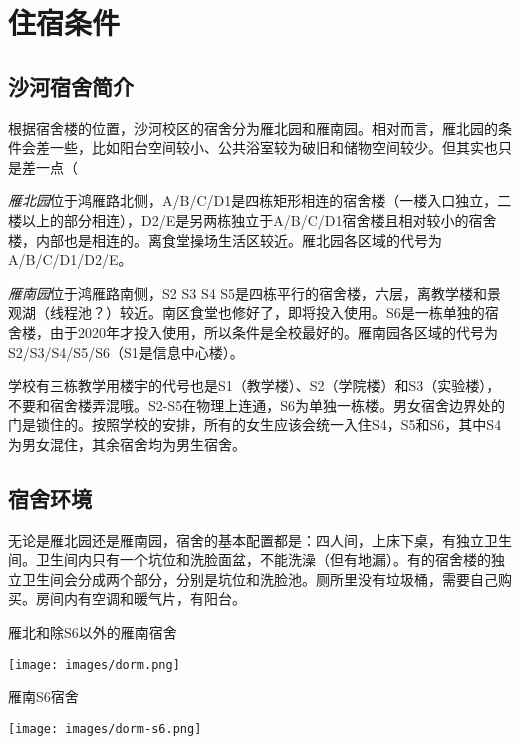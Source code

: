 \section{住宿条件}

\subsection{沙河宿舍简介}

根据宿舍楼的位置，沙河校区的宿舍分为雁北园和雁南园。相对而言，雁北园的条件会差一些，比如阳台空间较小、公共浴室较为破旧和储物空间较少。但其实也只是差一点（

\emph{雁北园}位于鸿雁路北侧，A/B/C/D1是四栋矩形相连的宿舍楼（一楼入口独立，二楼以上的部分相连），D2/E是另两栋独立于A/B/C/D1宿舍楼且相对较小的宿舍楼，内部也是相连的。离食堂操场生活区较近。雁北园各区域的代号为A/B/C/D1/D2/E。

\emph{雁南园}位于鸿雁路南侧，S2 S3 S4 S5是四栋平行的宿舍楼，六层，离教学楼和景观湖（线程池？）较近。南区食堂也修好了，即将投入使用。S6是一栋单独的宿舍楼，由于2020年才投入使用，所以条件是全校最好的。雁南园各区域的代号为S2/S3/S4/S5/S6（S1是信息中心楼）。

学校有三栋教学用楼宇的代号也是S1（教学楼）、S2（学院楼）和S3（实验楼），不要和宿舍楼弄混哦。S2-S5在物理上连通，S6为单独一栋楼。男女宿舍边界处的门是锁住的。按照学校的安排，所有的女生应该会统一入住S4，S5和S6，其中S4为男女混住，其余宿舍均为男生宿舍。

\subsection{宿舍环境}

无论是雁北园还是雁南园，宿舍的基本配置都是：四人间，上床下桌，有独立卫生间。卫生间内只有一个坑位和洗脸面盆，不能洗澡（但有地漏）。有的宿舍楼的独立卫生间会分成两个部分，分别是坑位和洗脸池。厕所里没有垃圾桶，需要自己购买。房间内有空调和暖气片，有阳台。

\begin{center}
    \begin{minipage}{0.45\textwidth}
        \centerline{\sffamily\small 雁北和除S6以外的雁南宿舍}
        \centerline{\texttt{[image: images/dorm.png]}}
    \end{minipage}
    \qquad
    \begin{minipage}{0.45\textwidth}
        \centerline{\sffamily\small 雁南S6宿舍}
        \centerline{\texttt{[image: images/dorm-s6.png]}}
    \end{minipage}
\end{center}


